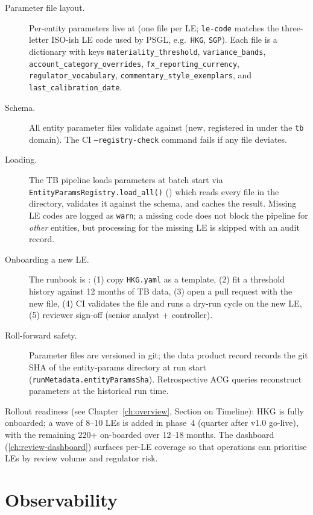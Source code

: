 \documentclass[11pt,a4paper,twoside]{report}
\begin{document}
\begin{description}
\item[Parameter file layout.] Per-entity parameters live at
(one file per LE; \texttt{le-code} matches the three-letter
ISO-ish LE code used by PSGL, e.g.\ \texttt{HKG},
\texttt{SGP}). Each file is a dictionary with keys
\texttt{materiality\_threshold}, \texttt{variance\_bands},
\texttt{account\_category\_overrides},
\texttt{fx\_reporting\_currency},
\texttt{regulator\_vocabulary},
\texttt{commentary\_style\_exemplars}, and
\texttt{last\_calibration\_date}.
\item[Schema.] All entity parameter files validate against
 (new,
registered in  under the
\texttt{tb} domain). The CI \texttt{--registry-check}
command fails if any file deviates.
\item[Loading.] The TB pipeline loads parameters at batch start
via \texttt{EntityParamsRegistry.load\_all()}
() which reads every file in
the directory, validates it against the schema, and caches
the result. Missing LE codes are logged as
\texttt{warn}; a missing code does not block the pipeline
for \emph{other} entities, but processing for the missing
LE is skipped with an audit record.
\item[Onboarding a new LE.] The runbook is
: (1) copy
\texttt{HKG.yaml} as a template, (2) fit a threshold
history against 12 months of TB data, (3) open a pull
request with the new file, (4) CI validates the file and
runs a dry-run cycle on the new LE, (5) reviewer sign-off
(senior analyst + controller).
\item[Roll-forward safety.] Parameter files are versioned in
git; the data product record records the git SHA of the
entity-params directory at run start
(\texttt{runMetadata.entityParamsSha}). Retrospective
ACG queries reconstruct parameters at the historical run
time.
\end{description}

\noindent
Rollout readiness (see Chapter~\ref{ch:overview}, Section on
Timeline): HKG is fully onboarded; a wave of 8--10 LEs is added in
phase~4 (quarter after v1.0 go-live), with the remaining 220+
on-boarded over 12--18 months. The dashboard
(\cref{ch:review-dashboard}) surfaces per-LE coverage so that
operations can prioritise LEs by review volume and regulator risk.

\section{Observability}
\end{document}
